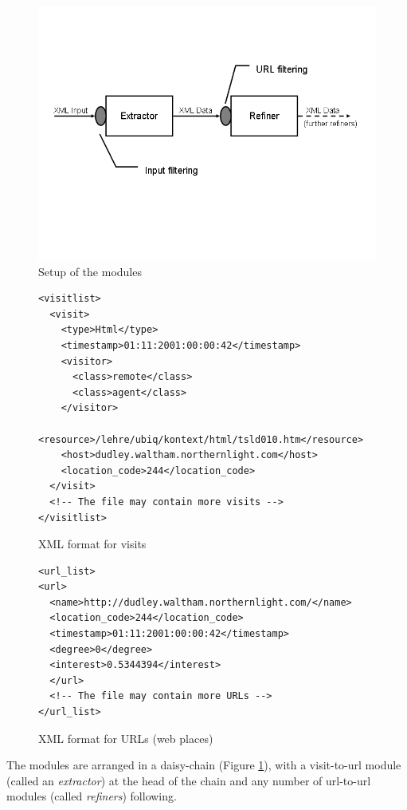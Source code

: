\documentclass[a4paper]{danarticle}
\theoremstyle{remark}
\begin{document}
      \begin{figure}[ht]
        \centering
        \includegraphics[width=12cm]{gilbert_steps}
        \caption{Setup of the modules}
        \label{gilbert_steps}
      \end{figure}
      \begin{figure}[ht]
\begin{verbatim}
<visitlist>
  <visit>
    <type>Html</type>
    <timestamp>01:11:2001:00:00:42</timestamp>
    <visitor>
      <class>remote</class>
      <class>agent</class>
    </visitor>
    <resource>/lehre/ubiq/kontext/html/tsld010.htm</resource>
    <host>dudley.waltham.northernlight.com</host>
    <location_code>244</location_code>
  </visit>
  <!-- The file may contain more visits -->
</visitlist>
\end{verbatim}
        \caption{XML format for visits}
	\label{visitxml}
      \end{figure}
      \begin{figure}[ht]
\begin{verbatim}
<url_list>
<url>
  <name>http://dudley.waltham.northernlight.com/</name>
  <location_code>244</location_code>
  <timestamp>01:11:2001:00:00:42</timestamp>
  <degree>0</degree>
  <interest>0.5344394</interest>
  </url>
  <!-- The file may contain more URLs -->
</url_list>
\end{verbatim}
        \caption{XML format for URLs (web places)}
	\label{urlxml}
      \end{figure}
      
      The modules are arranged in a daisy-chain (Figure \ref{gilbert_steps}), 
      with a visit-to-url module 
      (called an \textit{extractor}) at the head of the chain and any number of 
      url-to-url modules (called \textit{refiners}) following. 
      
\end{document}
